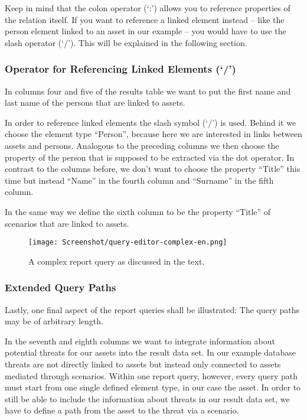 \documentclass[a4paper,10pt]{book}
\begin{document}
Keep in mind that the colon operator (`:') allows you to reference properties of
the relation itself. If you want to reference a linked element instead -- like
the person element linked to an asset in our example -- you would have to use
the slash operator (`/'). This will be explained in the following section.

\subsubsection{\texorpdfstring{Operator for Referencing Linked Elements
(`/')}{Operator for Referencing Linked Elements (/)}}\label{operator-for-referencing-linked-elements}

In columns four and five of the results table we want to put the first name and
last name of the persons that are linked to assets.

In order to reference linked elements the slash symbol (`/') is used. Behind it
we choose the element type ``Person'', because here we are interested in links
between assets and persons. Analogous to the preceding columns we then choose
the property of the person that is supposed to be extracted via the dot
operator. In contrast to the columns before, we don't want to choose the
property ``Title'' this time but instead ``Name'' in the fourth column and
``Surname'' in the fifth column.

In the same way we define the sixth column to be the property ``Title'' of
scenarios that are linked to assets.

\begin{figure}[htb!]
  \centering
  \texttt{[image: Screenshot/query-editor-complex-en.png]}
  \caption{A complex report query as discussed in the text.}
  \label{fig:complex-report-query}
\end{figure}

\subsubsection{Extended Query Paths}\label{extended-query-paths}

Lastly, one final aspect of the report queries shall be illustrated: The query
paths may be of arbitrary length.

In the seventh and eighth columns we want to integrate information about
potential threats for our assets into the result data set. In our example
database threats are not directly linked to assets but instead only connected to
assets mediated through scenarios. Within one report query, however, every query
path must start from one single defined element type, in our case the asset. In
order to still be able to include the information about threats in our result
data set, we have to define a path from the asset to the threat via a scenario.
\end{document}
